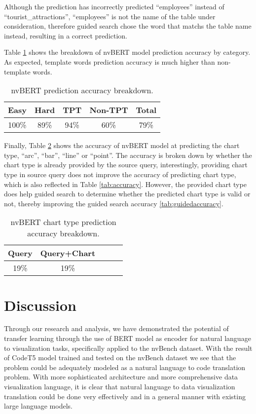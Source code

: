 \documentclass[
	a4paper, %
	10pt, %
	unnumberedsections, %
	twoside, %
]{t0003}
\begin{document}
Although the prediction has incorrectly predicted ``employees'' instead of ``tourist\_attractions'', ``employees'' is not the name of the table under consideration, therefore guided search chose the word that matchs the table name instead, resulting in a correct prediction.

Table \ref{tab:accuracybreakdown} shows the breakdown of nvBERT model prediction accuracy by category. As expected, template words prediction accuracy is much higher than non-template words.  

\begin{table}
	\caption{nvBERT prediction accuracy breakdown.}
	\centering
	\begin{tabular}{ccccc }
		\toprule
		Easy & Hard & TPT & Non-TPT & Total  \\
		\midrule
		100\% & 89\% & 94\% & 60\% & 79\% \\
		\bottomrule
	\end{tabular}
	\label{tab:accuracybreakdown}
\end{table}

Finally, Table \ref{tab:chartaccuracy} shows the accuracy of nvBERT model at predicting the chart type, ``arc'', ``bar'', ``line'' or ``point''. The accuracy is broken down by whether the chart type is already provided by the source query, interestingly, providing chart type in source query does not improve the accuracy of predicting chart type, which is also reflected in Table \ref{tab:accuracy}. However, the provided chart type does help guided search to determine whether the predicted chart type is valid or not, thereby improving the guided search accuracy \ref{tab:guidedaccuracy}.

\begin{table}
	\caption{nvBERT chart type prediction accuracy breakdown.}
	\centering
	\begin{tabular}{ccccc}
		\toprule
		Query & Query+Chart  \\
		\midrule
		19\% & 19\% \\
		\bottomrule
	\end{tabular}
	\label{tab:chartaccuracy}
\end{table}

\section{Discussion}

Through our research and analysis, we have demonstrated the potential of transfer learning through the use of BERT model as encoder for natural language to visualization tasks, specifically applied to the nvBench dataset. With the result of CodeT5 model trained and tested on the nvBench dataset we see that the problem could be adequately modeled as a natural language to code translation problem. With more sophisticated architecture and more comprehensive data visualization language, it is clear that natural language to data visualization translation could be done very effectively and in a general manner with existing large language models.
\end{document}
